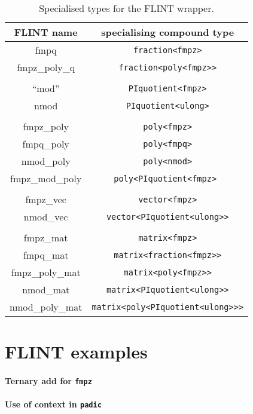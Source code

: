 \documentclass{scrartcl}
\begin{document}
\begin{table}[h]
\begin{center}
\begin{tabular}{cc}
FLINT name & specialising compound type \\
\hline
fmpq & \texttt{fraction<fmpz>} \\
fmpz\_poly\_q & \texttt{fraction<poly<fmpz>>} \\
\\
``mod'' & \texttt{PIquotient<fmpz>} \\
nmod & \texttt{PIquotient<ulong>} \\
\\
fmpz\_poly & \texttt{poly<fmpz>} \\
fmpq\_poly & \texttt{poly<fmpq>} \\
nmod\_poly & \texttt{poly<nmod>} \\
fmpz\_mod\_poly & \texttt{poly<PIquotient<fmpz> } \\
\\
fmpz\_vec & \texttt{vector<fmpz>} \\
nmod\_vec & \texttt{vector<PIquotient<ulong>>} \\
\\
fmpz\_mat & \texttt{matrix<fmpz>} \\
fmpq\_mat & \texttt{matrix<fraction<fmpz>>} \\
fmpz\_poly\_mat & \texttt{matrix<poly<fmpz>>} \\
nmod\_mat & \texttt{matrix<PIquotient<ulong>>} \\
nmod\_poly\_mat & \texttt{matrix<poly<PIquotient<ulong>>>}
\end{tabular}
\end{center}
\caption{Specialised types for the FLINT wrapper.}
\label{tab:specialised-types}
\end{table}

\section*{FLINT examples}

\paragraph{Ternary add for \texttt{fmpz}}

\paragraph{Use of context in \texttt{padic}}
\end{document}
